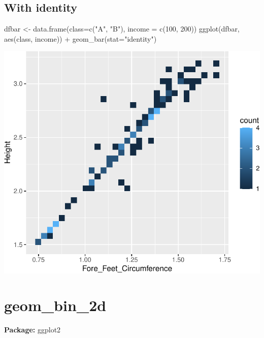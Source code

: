 \documentclass[
]{book}
\newenvironment{Shaded}{\begin{snugshade}}{\end{snugshade}}
\newcommand{\AttributeTok}[1]{\textcolor[rgb]{0.77,0.63,0.00}{#1}}
\newcommand{\DecValTok}[1]{\textcolor[rgb]{0.00,0.00,0.81}{#1}}
\newcommand{\FunctionTok}[1]{\textcolor[rgb]{0.00,0.00,0.00}{#1}}
\newcommand{\NormalTok}[1]{#1}
\newcommand{\OtherTok}[1]{\textcolor[rgb]{0.56,0.35,0.01}{#1}}
\newcommand{\SpecialCharTok}[1]{\textcolor[rgb]{0.00,0.00,0.00}{#1}}
\newcommand{\StringTok}[1]{\textcolor[rgb]{0.31,0.60,0.02}{#1}}
\begin{document}
\hypertarget{with-identity}{%
\subsection{With identity}\label{with-identity}}

\begin{Shaded}
\begin{Highlighting}[]
\NormalTok{dfbar }\OtherTok{\textless{}{-}} \FunctionTok{data.frame}\NormalTok{(}\AttributeTok{class=}\FunctionTok{c}\NormalTok{(}\StringTok{"A"}\NormalTok{, }\StringTok{"B"}\NormalTok{),  }\AttributeTok{income =} \FunctionTok{c}\NormalTok{(}\DecValTok{100}\NormalTok{, }\DecValTok{200}\NormalTok{))}
\FunctionTok{ggplot}\NormalTok{(dfbar, }\FunctionTok{aes}\NormalTok{(class, income)) }\SpecialCharTok{+}
  \FunctionTok{geom\_bar}\NormalTok{(}\AttributeTok{stat=}\StringTok{"identity"}\NormalTok{)}
\end{Highlighting}
\end{Shaded}

\includegraphics{Data-Visualisation-geom-Encyclopedia_files/figure-latex/unnamed-chunk-23-1.pdf}

\hypertarget{geom_bin_2d}{%
\section{geom\_bin\_2d}\label{geom_bin_2d}}

\textbf{Package: } ggplot2 \autocite{R-ggplot2}
\end{document}
